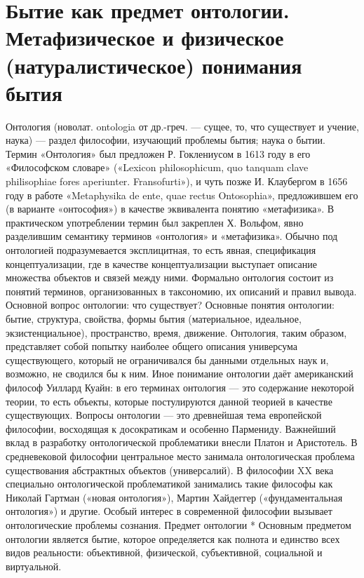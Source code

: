\documentclass[12pt]{article}
\begin{document}
\section{Бытие как предмет онтологии. Метафизическое и физическое (натуралистическое) понимания бытия}
Онтология (новолат. ontologia от др.-греч. — сущее, то, что существует и учение, наука) — раздел философии,
изучающий проблемы бытия; наука о бытии.
Термин «Онтология» был предложен Р. Гоклениусом в 1613 году в его «Философском словаре» («Lexicon
philosophicum, quo tanquam clave philisophiae fores aperiunter. Fransofurti»), и чуть позже И. Клаубергом в 1656
году в работе «Metaphysika de ente, quae rectus Ontosophia», предложившем его (в варианте «онтософия») в
качестве  эквивалента  понятию  «метафизика».  В  практическом  употреблении  термин  был  закреплен  Х.
Вольфом, явно разделившим семантику терминов «онтология» и «метафизика».
Обычно под онтологией подразумевается эксплицитная, то есть явная, спецификация концептуализации, где в
качестве  концептуализации  выступает  описание  множества  объектов  и  связей  между  ними.  Формально
онтология состоит из понятий терминов, организованных в таксономию, их описаний и правил вывода.
Основной вопрос онтологии: что существует?
Основные  понятия  онтологии:  бытие,  структура,  свойства,  формы  бытия  (материальное,  идеальное,
экзистенциальное), пространство, время, движение.
Онтология,  таким  образом,  представляет  собой  попытку  наиболее  общего  описания  универсума
существующего, который не ограничивался бы данными отдельных наук и, возможно, не сводился бы к ним.
Иное понимание онтологии даёт американский философ Уиллард Куайн: в его терминах онтология — это
содержание  некоторой  теории,  то  есть  объекты,  которые  постулируются  данной  теорией  в  качестве
существующих.
Вопросы онтологии — это древнейшая тема европейской философии, восходящая к досократикам и особенно
Пармениду. Важнейший вклад в разработку онтологической проблематики внесли Платон и Аристотель. В
средневековой философии центральное место занимала онтологическая проблема существования абстрактных
объектов (универсалий).
В философии XX века специально онтологической проблематикой занимались такие философы как Николай
Гартман («новая онтология»), Мартин Хайдеггер («фундаментальная онтология») и другие. Особый интерес в
современной философии вызывает онтологические проблемы сознания.
Предмет онтологии
* Основным предметом онтологии является бытие, которое определяется как полнота и единство всех видов
реальности: объективной, физической, субъективной, социальной и виртуальной.
\end{document}
